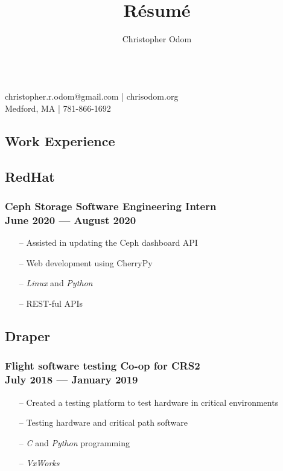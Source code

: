 \documentclass[11pt]{article}
\makeatletter
\renewcommand{\maketitle}
{
	\Huge \noindent \theauthor \\
	\large\noindent christopher.r.odom@gmail.com | chrisodom.org \\
	Medford, MA | 781-866-1692
}
\makeatother
\begin{document}
\setlength\multicolsep{0pt}


\title{R\'esum\'e}

\author{Christopher Odom}

\maketitle

\color{darkgrey}
\vspace{1em}

\begin{multicols}{2}

\section{Work Experience}

\subsection{RedHat}
\subsubsection{Ceph Storage Software Engineering Intern\\ June 2020 --- August 2020}
\begin{itemize}[noitemsep, topsep=0pt]
	\item[--] Assisted in updating the Ceph dashboard API
	\item[--] Web development using CherryPy
	\item[--] \emph{Linux} and \emph{Python}
	\item[--] REST-ful APIs
\end{itemize}
\noindent

\subsection{Draper}
\subsubsection{Flight software testing Co-op for CRS2\\ July 2018 --- January 2019}
\begin{itemize}[noitemsep, topsep=0pt]
	\item[--] Created a testing platform to test hardware in critical environments
	\item[--] Testing hardware and critical path software
	\item[--] \emph{C} and \emph{Python} programming
	\item[--] \emph{VxWorks}
\end{itemize}


\end{multicols}
\end{document}
